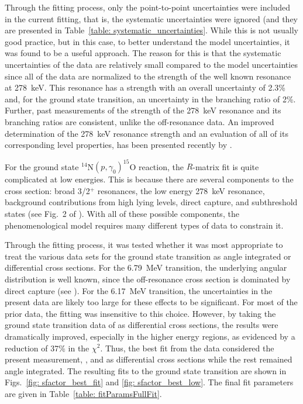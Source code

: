 Through the fitting process, only the point-to-point uncertainties were included in the current fitting, that is, the systematic uncertainties were ignored (and they are presented in Table~\ref{table: systematic_uncertainties}. While this is not usually good practice, but in this case, to better understand the model uncertainties, it was found to be a useful approach. The reason for this is that the systematic uncertainties of the data are relatively small compared to the model uncertainties since all of the data are normalized to the strength of the well known resonance at 278~keV. This resonance has a strength with an overall uncertainty of 2.3\% and, for the ground state transition, an uncertainty in the branching ratio of 2\%. Further, past measurements of the strength of the 278~keV resonance and its branching ratios are consistent, unlike the off-resonance data. An improved determination of the 278~keV resonance strength and an evaluation of all of its corresponding level properties, has been presented recently by \citet{Daigle2016}.

For the ground state $^{14}$N$(p,\gamma_0)^{15}$O reaction, the $R$-matrix fit is quite complicated at low energies. This is because there are several components to the cross section: broad 3/2$^+$ resonances, the low energy 278~keV resonance, background contributions from high lying levels, direct capture, and subthreshold states (see Fig.~2 of \citet{PhysRevC.91.045804}). With all of these possible components, the phenomenological model requires many different types of data to constrain it.

Through the fitting process, it was tested whether it was most appropriate to treat the various data sets for the ground state transition as angle integrated or differential cross sections. For the 6.79~MeV transition, the underlying angular distribution is well known, since the off-resonance cross section is dominated by direct capture (see \citet{Li2016}). For the 6.17~MeV transition, the uncertainties in the present data are likely too large for these effects to be significant. For most of the prior data, the fitting was insensitive to this choice. However, by taking the ground state transition data of \citet{Schroder1987} as differential cross sections, the results were dramatically improved, especially in the higher energy regions, as evidenced by a reduction of 37\% in the $\chi^{2}$. Thus, the best fit from the data considered the present measurement, \citet{Schroder1987}, and \citet{Li2016} as differential cross sections while the rest remained angle integrated. The resulting fits to the ground state transition are shown in Figs.~\ref{fig: sfactor_best_fit} and \ref{fig: sfactor_best_low}. The final fit parameters are given in Table~\ref{table: fitParamsFullFit}.


